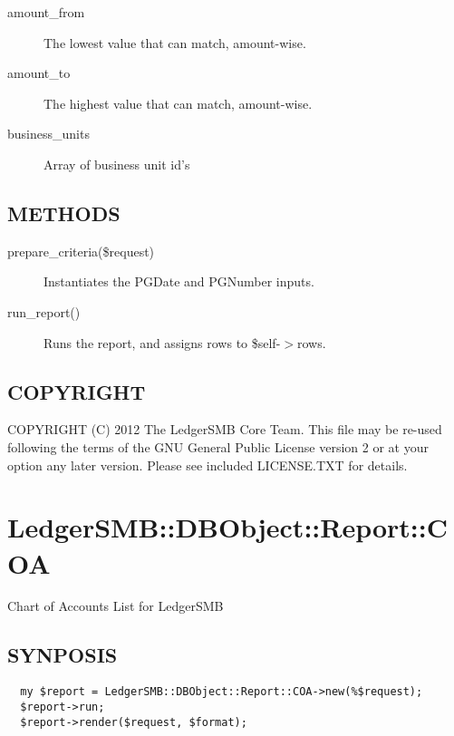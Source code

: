 \begin{description}
\begin{description}
\begin{description}
\begin{description}
\begin{description}
\begin{description}
\begin{description}
\begin{description}
\begin{description}
\begin{description}
\begin{description}
\item[{amount\_from}] \mbox{}

The lowest value that can match, amount-wise.


\item[{amount\_to}] \mbox{}

The highest value that can match, amount-wise.


\item[{business\_units}] \mbox{}

Array of business unit id's

\end{description}
\subsection*{METHODS\label{LedgerSMB::DBObject::Report::GL_METHODS}}
\begin{description}

\item[{prepare\_criteria(\$request)}] \mbox{}

Instantiates the PGDate and PGNumber inputs.


\item[{run\_report()}] \mbox{}

Runs the report, and assigns rows to \$self-$>$rows.

\end{description}
\subsection*{COPYRIGHT\label{LedgerSMB::DBObject::Report::GL_COPYRIGHT}}


COPYRIGHT (C) 2012 The LedgerSMB Core Team.  This file may be re-used following
the terms of the GNU General Public License version 2 or at your option any
later version.  Please see included LICENSE.TXT for details.

\section{LedgerSMB::DBObject::Report::COA\label{LedgerSMB::DBObject::Report::COA}}


Chart of Accounts List for LedgerSMB

\subsection*{SYNPOSIS\label{LedgerSMB::DBObject::Report::COA_SYNPOSIS}}
\begin{verbatim}
  my $report = LedgerSMB::DBObject::Report::COA->new(%$request);
  $report->run;
  $report->render($request, $format);
\end{verbatim}

\end{description}
\end{description}
\end{description}
\end{description}
\end{description}
\end{description}
\end{description}
\end{description}
\end{description}
\end{description}
